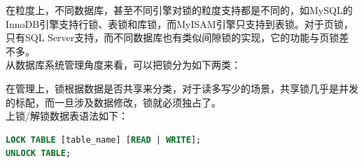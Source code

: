 \documentclass[12pt, openany, oneside]{book}
\begin{document}
\begin{table}[H]
	\centering
	\caption{锁的粒度分类}
\end{table}

在粒度上，不同数据库，甚至不同引擎对锁的粒度支持都是不同的，如MySQL的InnoDB引擎支持行锁、表锁和库锁，而MyISAM引擎只支持到表锁。对于页锁，只有SQL Server支持，而不同数据库也有类似间隙锁的实现，它的功能与页锁差不多。\\

从数据库系统管理角度来看，可以把锁分为如下两类：

\begin{table}[H]
	\centering
	\caption{锁的管理分类}
\end{table}

在管理上，锁根据数据是否共享来分类，对于读多写少的场景，共享锁几乎是并发的标配，而一旦涉及数据修改，锁就必须独占了。\\

上锁/解锁数据表语法如下：

\vspace{-0.5cm}

\begin{lstlisting}[language=SQL]
LOCK TABLE [table_name] [READ | WRITE];
UNLOCK TABLE;
\end{lstlisting}
\end{document}
